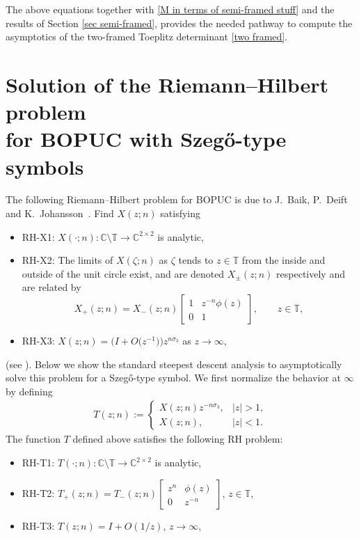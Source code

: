 \documentclass[pdftex]{sigma}
\numberwithin{equation}{section}
\newcommand{\C}{{\mathbb C}}
\newcommand{\T}{{\mathbb T}}
\newcommand{\ze}{\zeta}
\begin{document}
		The above equations together with \eqref{M in terms of semi-framed stuff} and the results of Section \ref{sec semi-framed}, provides the needed pathway to compute the asymptotics of the two-framed Toeplitz determinant \eqref{two framed}.
		
\appendix
		
		
		\section[Solution of the Riemann--Hilbert problem for BOPUC\\ with Szeg\H{o}-type symbols]{Solution of the Riemann--Hilbert problem \\
for BOPUC with Szeg\H{o}-type symbols}\label{Appendices}
		
		
		
		The following Riemann--Hilbert problem for BOPUC is due to J.~Baik, P.~Deift and K.~Johansson~\cite{BDJ}. Find $X(z;n)$ satisfying
		\begin{itemize}\itemsep=0pt
			\item {\rm RH-X1:} $X(\cdot;n)\colon\C\setminus \T \to \C^{2\times2}$ is analytic,
			\item {\rm RH-X2:} The limits of $X(\ze;n)$ as $\ze$ tends to $z \in \T $ from the inside and outside of the unit circle exist, and are denoted $X_{\pm}(z;n)$ respectively and are related by
			\[
				X_+(z;n)=X_-(z;n)\begin{bmatrix}
					1 & z^{-n}\phi(z) \\
					0 & 1
				\end{bmatrix}, \qquad z \in \T,
			\]
			
			\item {\rm RH-X3:} $X(z;n)=\big( I + O\big(z^{-1}\big) \big) z^{n \sigma_3}$ as $z \to \infty$,
		\end{itemize}
		(see \cite{D, DIK}). Below we show the standard steepest descent analysis to asymptotically solve this problem for a Szeg\H{o}-type symbol. We first normalize the behavior at $\infty$ by defining \begin{gather*}%
			T(z;n) := \begin{cases}
				X(z;n)z^{-n\sigma_3}, & |z|>1, \\
				X(z;n), & |z|<1.
			\end{cases}
		\end{gather*}
		The function $T$ defined above satisfies the following RH problem:
				\begin{itemize}\itemsep=0pt
			\item {\rm RH-T1:} $T(\cdot;n) \colon\C\setminus \T \to \C^{2\times2}$ is analytic,
			\item {\rm RH-T2:} $T_{+}(z;n)=T_{-}(z;n)\begin{bmatrix}
				z^n & \phi(z) \\
				0 & z^{-n}
			\end{bmatrix}$, $z \in \T$,
			\item {\rm RH-T3:} $T(z;n)=I+O(1/z)$, $ z \to \infty$,
		\end{itemize}
\end{document}
